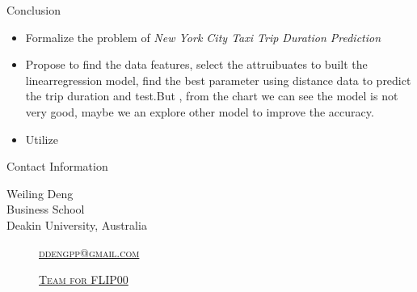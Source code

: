 \documentclass[
 size=14pt,
 paper=smartboard,  %
 mode=present, 		%
 display=slides, 	%
 style=tuliplab,  	%
 pauseslide,
 fleqn,leqno]{powerdot}
\begin{document}
\begin{slide}[toc=,bm=]{Conclusion}
\begin{itemize}
\item
\smallskip
Formalize the problem of \emph{New York City Taxi Trip Duration Prediction} 

\item
\smallskip
Propose to find the data features, select the attruibuates to built the linearregression model, find the best parameter using distance data to predict the trip duration and test.But , from the chart we can see the model is not very good, maybe we an explore other model to improve the accuracy.

\item
\smallskip
Utilize 

\end{itemize}



\end{slide}
\begin{wideslide}[toc=,bm=]{Contact Information}
\centering
{}
\twocolumn[
lcolwidth=0.35\linewidth,
rcolwidth=0.65\linewidth
]
{
}
{
Weiling Deng\\
Business School\\
Deakin University, Australia
\begin{description}
 \item[\textcolor{orange}{\faEnvelope}] \href{ddengpp@gmail.com}
 {\textsc{\footnotesize{ddengpp@gmail.com}}}

 \item[\textcolor{orange}{\faHome}] \href{http://www.tulip.org.au}
 {\textsc{\footnotesize{Team for FLIP00}}}
\end{description}
}
\end{wideslide}
\end{document}
